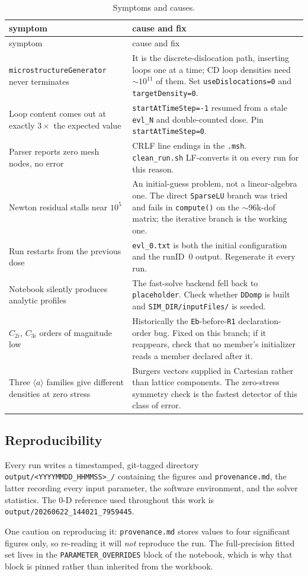 \documentclass[11pt]{article}
\newcommand{\aloop}{\ensuremath{\langle a\rangle}}
\newcommand{\code}[1]{\texttt{\small #1}}
\newcommand{\file}[1]{\texttt{\footnotesize #1}}
\begin{document}
\begin{longtable}{@{}p{}p{}@{}}
\caption{Symptoms and causes.}
\label{tab:trouble}\\
\toprule
symptom & cause and fix \\
\midrule
\endfirsthead
\toprule
symptom & cause and fix \\
\midrule
\endhead
\code{microstructureGenerator} never terminates &
  It is the discrete-dislocation path, inserting loops one at a time; CD loop
  densities need $\sim10^{11}$ of them. Set \code{useDislocations=0} and
  \code{targetDensity=0}. \\
Loop content comes out at exactly $3\times$ the expected value &
  \code{startAtTimeStep=-1} resumed from a stale \file{evl\_N} and
  double-counted dose. Pin \code{startAtTimeStep=0}. \\
Parser reports zero mesh nodes, no error &
  CRLF line endings in the \file{.msh}. \file{clean\_run.sh} LF-converts it on
  every run for this reason. \\
Newton residual stalls near $10^{5}$ &
  An initial-guess problem, not a linear-algebra one. The direct
  \code{SparseLU} branch was tried and fails in \code{compute()} on the
  $\sim$96k-dof matrix; the iterative branch is the working one. \\
Run restarts from the previous dose &
  \file{evl\_0.txt} is both the initial configuration and the runID~0 output.
  Regenerate it every run. \\
Notebook silently produces analytic profiles &
  The fast-solve backend fell back to \code{placeholder}. Check whether
  \code{DDomp} is built and \file{SIM\_DIR/inputFiles/} is seeded. \\
$C_{2i}$, $C_{3i}$ orders of magnitude low &
  Historically the \code{Eb}-before-\code{R1} declaration-order bug. Fixed on
  this branch; if it reappears, check that no member's initializer reads a
  member declared after it. \\
Three \aloop{} families give different densities at zero stress &
  Burgers vectors supplied in Cartesian rather than lattice components. The
  zero-stress symmetry check is the fastest detector of this class of error. \\
\bottomrule
\end{longtable}

\subsection{Reproducibility}

Every run writes a timestamped, git-tagged directory
\file{output/<YYYYMMDD\_HHMMSS>\_<git-hash>/} containing the figures and
\file{provenance.md}, the latter recording every input parameter, the software
environment, and the solver statistics. The 0-D reference used throughout this
work is \file{output/20260622\_144021\_7959445}.

One caution on reproducing it: \file{provenance.md} stores values to four
significant figures only, so re-reading it will \emph{not} reproduce the run.
The full-precision fitted set lives in the \code{PARAMETER\_OVERRIDES} block of
the notebook, which is why that block is pinned rather than inherited from the
workbook.
\end{document}
